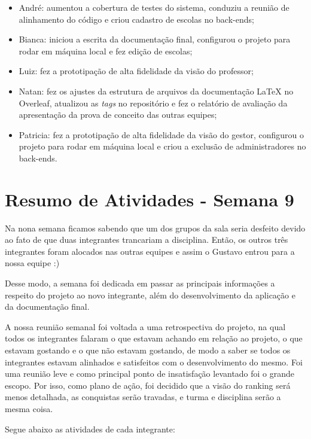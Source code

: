 \documentclass[
    12pt,               %
    openright,          %
    oneside,
    a4paper,            %
    english,            %
    brazil              %
    ]{ifsp-spo-inf-ctds} %
\begin{document}
\begin{apendicesenv}
\begin{itemize}
\item André: aumentou a cobertura de testes do sistema, conduziu a reunião de alinhamento do código e criou cadastro de escolas no \glspl{back-end};
\item Bianca: iniciou a escrita da documentação final, configurou o projeto para rodar em máquina local e fez edição de escolas;
\item Luiz: fez a prototipação de alta fidelidade da visão do professor;
\item Natan: fez os ajustes da estrutura de arquivos da documentação LaTeX no Overleaf, atualizou as \textit{tags} no repositório e fez o relatório de avaliação da apresentação da prova de conceito das outras equipes; 
\item Patricia: fez a prototipação de alta fidelidade da visão do gestor, configurou o projeto para rodar em máquina local e criou a exclusão de administradores no \glspl{back-end}.
\end{itemize}

\section{Resumo de Atividades - Semana 9}
Na nona semana ficamos sabendo que um dos grupos da sala seria desfeito devido ao fato de que duas integrantes trancariam a disciplina. Então, os outros três integrantes foram alocados nas outras equipes e assim o Gustavo entrou para a nossa equipe :)

Desse modo, a semana foi dedicada em passar as principais informações a respeito do projeto ao novo integrante, além do desenvolvimento da aplicação e da documentação final.

A nossa reunião semanal foi voltada a uma retrospectiva do projeto, na qual todos os integrantes falaram o que estavam achando em relação ao projeto, o que estavam gostando e o que não estavam gostando, de modo a saber se todos os integrantes estavam alinhados e satisfeitos com o desenvolvimento do mesmo. Foi uma reunião leve e como principal ponto de insatisfação levantado foi o grande escopo. Por isso, como plano de ação, foi decidido que a visão do \gls{ranking} será menos detalhada, as conquistas serão travadas, e turma e disciplina serão a mesma coisa.

Segue abaixo as atividades de cada integrante:


\end{apendicesenv}
\end{document}
